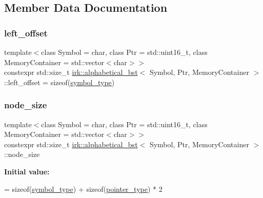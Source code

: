 \subsection{Member Data Documentation}
\mbox{\label{classirk_1_1alphabetical__bst_a0cc871d4fcdf8a37436594bc32eec076}} 
\subsubsection{\texorpdfstring{left\+\_\+offset}{left\_offset}}
{\footnotesize\ttfamily template$<$class Symbol = char, class Ptr = std\+::uint16\+\_\+t, class Memory\+Container = std\+::vector$<$char$>$$>$ \\
constexpr std\+::size\+\_\+t \mbox{\hyperlink{classirk_1_1alphabetical__bst}{irk\+::alphabetical\+\_\+bst}}$<$ Symbol, Ptr, Memory\+Container $>$\+::left\+\_\+offset = sizeof(\mbox{\hyperlink{classirk_1_1alphabetical__bst_a296ccb8fa9fa9dce3b3c3beab0a5ca28}{symbol\+\_\+type}})\hspace{0.3cm}{\ttfamily [static]}}

\mbox{\label{classirk_1_1alphabetical__bst_a6f7d3f7002730eb7840e449d4d371235}} 
\subsubsection{\texorpdfstring{node\+\_\+size}{node\_size}}
{\footnotesize\ttfamily template$<$class Symbol = char, class Ptr = std\+::uint16\+\_\+t, class Memory\+Container = std\+::vector$<$char$>$$>$ \\
constexpr std\+::size\+\_\+t \mbox{\hyperlink{classirk_1_1alphabetical__bst}{irk\+::alphabetical\+\_\+bst}}$<$ Symbol, Ptr, Memory\+Container $>$\+::node\+\_\+size\hspace{0.3cm}{\ttfamily [static]}}

{\bfseries Initial value\+:}
\begin{DoxyCode}
=
        \textcolor{keyword}{sizeof}(\mbox{\hyperlink{classirk_1_1alphabetical__bst_a296ccb8fa9fa9dce3b3c3beab0a5ca28}{symbol\_type}}) + \textcolor{keyword}{sizeof}(\mbox{\hyperlink{classirk_1_1alphabetical__bst_ae689c05ab96a71769e24908d5c73765c}{pointer\_type}}) * 2
\end{DoxyCode}
\mbox{\label{classirk_1_1alphabetical__bst_ac354051aeafc78d341cc467d65c8c45a}} 
